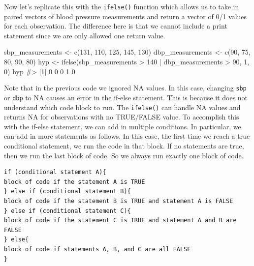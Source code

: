 \documentclass[
  letterpaper,
]{latex/krantz}
\makeatletter
\newenvironment{Shaded}{\begin{snugshade}}{\end{snugshade}}
\newcommand{\CommentTok}[1]{\textcolor[rgb]{0.37,0.37,0.37}{#1}}
\newcommand{\DecValTok}[1]{\textcolor[rgb]{0.68,0.00,0.00}{#1}}
\newcommand{\FunctionTok}[1]{\textcolor[rgb]{0.28,0.35,0.67}{#1}}
\newcommand{\NormalTok}[1]{\textcolor[rgb]{0.00,0.23,0.31}{#1}}
\newcommand{\OtherTok}[1]{\textcolor[rgb]{0.00,0.23,0.31}{#1}}
\newcommand{\SpecialCharTok}[1]{\textcolor[rgb]{0.37,0.37,0.37}{#1}}
\newenvironment{kframe}{%
\medskip{}
\setlength{\fboxsep}{.8em}
 \def\at@end@of@kframe{}%
 \ifinner\ifhmode%
  \def\at@end@of@kframe{\end{minipage}}%
  \begin{minipage}{\columnwidth}%
 \fi\fi%
 \def\FrameCommand##1{\hskip\@totalleftmargin \hskip-\fboxsep
 \colorbox{shadecolor}{##1}\hskip-\fboxsep
     \hskip-\linewidth \hskip-\@totalleftmargin \hskip\columnwidth}%
 \MakeFramed {\advance\hsize-\width
   \@totalleftmargin\z@ \linewidth\hsize
   \@setminipage}}%
 {\par\unskip\endMakeFramed%
 \at@end@of@kframe}
\renewenvironment{Shaded}{\begin{kframe}}{\end{kframe}}
\makeatother
\begin{document}
Now let's replicate this with the \texttt{ifelse()} function which
allows us to take in paired vectors of blood pressure measurements and
return a vector of 0/1 values for each observation. The difference here
is that we cannot include a print statement since we are only allowed
one return value.

\begin{Shaded}
\begin{Highlighting}[]
\NormalTok{sbp\_measurements }\OtherTok{\textless{}{-}} \FunctionTok{c}\NormalTok{(}\DecValTok{131}\NormalTok{, }\DecValTok{110}\NormalTok{, }\DecValTok{125}\NormalTok{, }\DecValTok{145}\NormalTok{, }\DecValTok{130}\NormalTok{)}
\NormalTok{dbp\_measurements }\OtherTok{\textless{}{-}} \FunctionTok{c}\NormalTok{(}\DecValTok{90}\NormalTok{, }\DecValTok{75}\NormalTok{, }\DecValTok{80}\NormalTok{, }\DecValTok{90}\NormalTok{, }\DecValTok{80}\NormalTok{)}
\NormalTok{hyp }\OtherTok{\textless{}{-}} \FunctionTok{ifelse}\NormalTok{(sbp\_measurements }\SpecialCharTok{\textgreater{}} \DecValTok{140} \SpecialCharTok{|}\NormalTok{ dbp\_measurements }\SpecialCharTok{\textgreater{}} \DecValTok{90}\NormalTok{, }\DecValTok{1}\NormalTok{, }\DecValTok{0}\NormalTok{)}
\NormalTok{hyp}
\CommentTok{\#\textgreater{} [1] 0 0 0 1 0}
\end{Highlighting}
\end{Shaded}

Note that in the previous code we ignored NA values. In this case,
changing \texttt{sbp} or \texttt{dbp} to NA causes an error in the
if-else statement. This is because it does not understand which code
block to run. The \texttt{ifelse()} can handle NA values and returns NA
for observations with no TRUE/FALSE value. To accomplish this with the
if-else statement, we can add in multiple conditions. In particular, we
can add in more statements as follows. In this case, the first time we
reach a true conditional statement, we run the code in that block. If no
statements are true, then we run the last block of code. So we always
run exactly one block of code.

\begin{verbatim}
if (conditional statement A){
block of code if the statement A is TRUE
} else if (conditional statement B){
block of code if the statement B is TRUE and statement A is FALSE
} else if (conditional statement C){
block of code if the statement C is TRUE and statement A and B are FALSE
} else{
block of code if statements A, B, and C are all FALSE
}
\end{verbatim}
\end{document}
